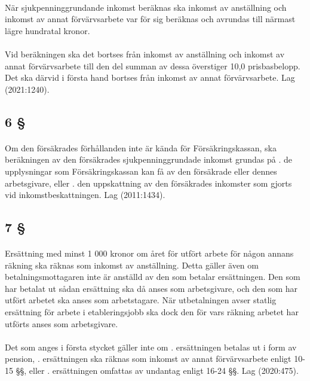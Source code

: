 \documentclass[a4paper,notitlepage,openany,10pt]{book}
\begin{document}
\paragraph*{}
När sjukpenninggrundande inkomst beräknas ska inkomst av anställning och inkomst av annat förvärvsarbete var för sig beräknas och avrundas till närmast lägre hundratal kronor.
\paragraph*{}
Vid beräkningen ska det bortses från inkomst av anställning och inkomst av annat förvärvsarbete till den del summan av dessa överstiger 10,0 prisbasbelopp. Det ska därvid i första hand bortses från inkomst av annat förvärvsarbete.
Lag (2021:1240).
\subsection*{6 §}
\paragraph*{}
Om den försäkrades förhållanden inte är kända för Försäkringskassan, ska beräkningen av den försäkrades sjukpenninggrundade inkomst grundas på
. de upplysningar som Försäkringskassan kan få av den försäkrade eller dennes arbetsgivare, eller
. den uppskattning av den försäkrades inkomster som gjorts vid inkomstbeskattningen.
Lag (2011:1434).
\subsection*{7 §}
\paragraph*{}
Ersättning med minst 1 000 kronor om året för utfört arbete för någon annans räkning ska räknas som inkomst av anställning. Detta gäller även om betalningsmottagaren inte är anställd av den som betalar ersättningen. Den som har betalat ut sådan ersättning ska då anses som arbetsgivare, och den som har utfört arbetet ska anses som arbetstagare. När utbetalningen avser statlig ersättning för arbete i etableringsjobb ska dock den för vars räkning arbetet har utförts anses som arbetsgivare.
\paragraph*{}
Det som anges i första stycket gäller inte om
. ersättningen betalas ut i form av pension,
. ersättningen ska räknas som inkomst av annat förvärvsarbete enligt 10-15 §§, eller
. ersättningen omfattas av undantag enligt 16-24 §§.
Lag (2020:475).
\end{document}
